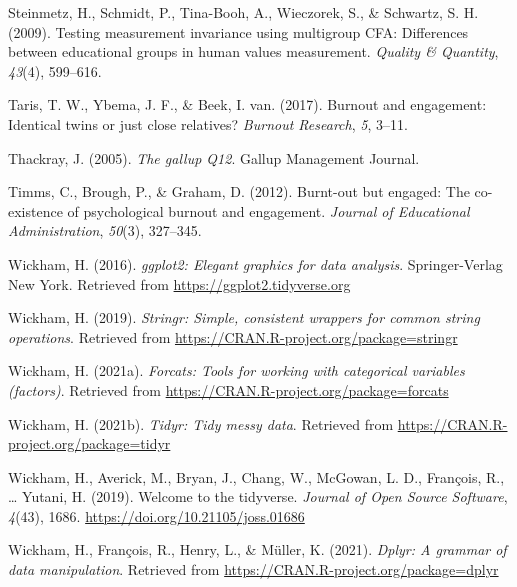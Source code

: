 \documentclass[
  man]{apa7}
\newlength{\cslhangindent}
\newlength{\cslentryspacingunit} %
\newenvironment{CSLReferences}[2] %
 {%
  \setlength{\parindent}{0pt}
  \ifodd #1
  \let\oldpar\par
  \def\par{\hangindent=\cslhangindent\oldpar}
  \fi
  \setlength{\parskip}{#2\cslentryspacingunit}
 }%
 {}
\begin{document}
\begin{CSLReferences}{1}{0}
\leavevmode{}%
Steinmetz, H., Schmidt, P., Tina-Booh, A., Wieczorek, S., \& Schwartz, S. H. (2009). Testing measurement invariance using multigroup CFA: Differences between educational groups in human values measurement. \emph{Quality \& Quantity}, \emph{43}(4), 599--616.

\leavevmode{}%
Taris, T. W., Ybema, J. F., \& Beek, I. van. (2017). Burnout and engagement: Identical twins or just close relatives? \emph{Burnout Research}, \emph{5}, 3--11.

\leavevmode{}%
Thackray, J. (2005). \emph{The gallup Q12}. Gallup Management Journal.

\leavevmode{}%
Timms, C., Brough, P., \& Graham, D. (2012). Burnt-out but engaged: The co-existence of psychological burnout and engagement. \emph{Journal of Educational Administration}, \emph{50}(3), 327--345.

\leavevmode{}%
Wickham, H. (2016). \emph{ggplot2: Elegant graphics for data analysis}. Springer-Verlag New York. Retrieved from \url{https://ggplot2.tidyverse.org}

\leavevmode{}%
Wickham, H. (2019). \emph{Stringr: Simple, consistent wrappers for common string operations}. Retrieved from \url{https://CRAN.R-project.org/package=stringr}

\leavevmode{}%
Wickham, H. (2021a). \emph{Forcats: Tools for working with categorical variables (factors)}. Retrieved from \url{https://CRAN.R-project.org/package=forcats}

\leavevmode{}%
Wickham, H. (2021b). \emph{Tidyr: Tidy messy data}. Retrieved from \url{https://CRAN.R-project.org/package=tidyr}

\leavevmode{}%
Wickham, H., Averick, M., Bryan, J., Chang, W., McGowan, L. D., François, R., \ldots{} Yutani, H. (2019). Welcome to the {tidyverse}. \emph{Journal of Open Source Software}, \emph{4}(43), 1686. \url{https://doi.org/10.21105/joss.01686}

\leavevmode{}%
Wickham, H., François, R., Henry, L., \& Müller, K. (2021). \emph{Dplyr: A grammar of data manipulation}. Retrieved from \url{https://CRAN.R-project.org/package=dplyr}


\end{CSLReferences}
\end{document}
